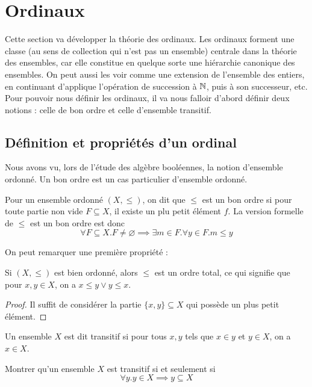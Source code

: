 \section{Ordinaux}

Cette section va développer la théorie des ordinaux. Les ordinaux forment une classe (au sens de collection qui n'est pas un ensemble) centrale dans la théorie des ensembles, car elle constitue en quelque sorte une hiérarchie canonique des ensembles. On peut aussi les voir comme une extension de l'ensemble des entiers, en continuant d'applique l'opération de succession à $\mathbb{N}$, puis à son successeur, etc. Pour pouvoir nous définir les ordinaux, il va nous falloir d'abord définir deux notions : celle de bon ordre et celle d'ensemble transitif.

\subsection{Définition et propriétés d'un ordinal}

Nous avons vu, lors de l'étude des algèbre booléennes, la notion d'ensemble ordonné. Un bon ordre est un cas particulier d'ensemble ordonné.

\begin{defi}
    Pour un ensemble ordonné $(X,\leq)$, on dit que $\leq$ est un bon ordre si pour toute partie non vide $F\subseteq X$, il existe un plu petit élément $f$. La version formelle de \og $\leq$ est un bon ordre\fg{} est donc $$\forall F\subseteq X. F\neq \varnothing \implies \exists m\in F. \forall y\in F. m\leq y$$
\end{defi}

On peut remarquer une première propriété :

\begin{prop}
    Si $(X,\leq)$ est bien ordonné, alors $\leq$ est un ordre total, ce qui signifie que pour $x,y\in X$, on a $x\leq y \lor y\leq x$.
\end{prop}

\begin{proof}
    Il suffit de considérer la partie $\{x,y\}\subseteq X$ qui possède un plus petit élément.
\end{proof}

\begin{defi}
    Un ensemble $X$ est dit transitif si pour tous $x,y$ tels que $x\in y$ et $y\in X$, on a $x\in X$.
\end{defi}

\begin{exo}
    Montrer qu'un ensemble $X$ est transitif si et seulement si $$\forall y. y\in X \implies y \subseteq X$$
\end{exo}

